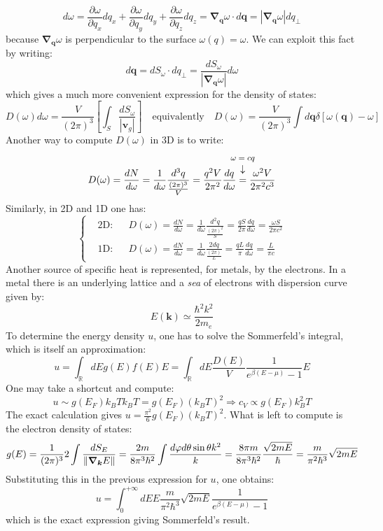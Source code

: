 \documentclass[10.75pt,a4paper,openright,bottom=2cm]{article}
\renewcommand{\Vec}[1]{\boldsymbol{#1}}
\begin{document}
\[
d\omega=\frac{\partial\omega}{\partial q_x}dq_x+\frac{\partial\omega}{\partial q_y}dq_y+\frac{\partial\omega}{\partial q_z}dq_z=\Vec{\nabla}_{\Vec{q}}\omega\cdot d\Vec{q}=|\Vec{\nabla}_{\Vec{q}}\omega|dq_\perp
\]
because $\Vec{\nabla}_{\Vec{q}}\omega$ is perpendicular to the surface $\omega(q)=\omega$. We can exploit this fact by writing: 
\[
d\Vec{q}=dS_\omega\cdot dq_\perp=\frac{dS_\omega}{|\Vec{\nabla}_{\Vec{q}}\omega|}d\omega
\]
which gives a much more convenient expression for the density of states:
\[
D(\omega)d\omega=\frac{V}{(2\pi)^3}\left[\int_S\frac{dS_\omega}{|\Vec{v}_g|}\right] \quad \text{equivalently} \quad D(\omega)=\frac{V}{(2\pi)^3}\int d\Vec{q}\delta[\omega(\Vec{q})-\omega]
\]
Another way to compute $D(\omega)$ in 3D is to write:
\[
D(\omega)=\frac{dN}{d\omega}=\frac{1}{d\omega}\frac{d^3q}{\frac{(2\pi)^3}{V}}=\frac{q^2V}{2\pi^2}\frac{dq}{d\omega}\overset{\mathclap{\tikz \node {$\downarrow$} node [above=1ex] {\footnotesize $\omega=cq$};}}{=}\frac{\omega^2V}{2\pi^2c^3}
\]
Similarly, in 2D and 1D one has:
\[
\left\{
\begin{aligned}
&\text{2D:} &&D(\omega)=\frac{dN}{d\omega}=\frac{1}{d\omega}\frac{d^2q}{\frac{(2\pi)^2}{S}}=\frac{qS}{2\pi}\frac{dq}{d\omega}=\frac{\omega S}{2\pi c^2}\\
&\text{1D:} &&D(\omega)=\frac{dN}{d\omega}=\frac{1}{d\omega}\frac{2dq}{\frac{(2\pi)}{L}}=\frac{qL}{\pi}\frac{dq}{d\omega}=\frac{L}{\pi c}
\end{aligned}
\right.
\]
Another source of specific heat is represented, for metals, by the electrons. In a metal there is an underlying lattice and a \textit{sea} of electrons with dispersion curve given by:
\[
E(\Vec{k})\simeq\frac{\hbar^2k^2}{2m_e}
\]
To determine the energy density $u$, one has to solve the Sommerfeld's integral, which is itself an approximation:
\[
u=\int_\mathbb{R}dEg(E)f(E)E=\int_\mathbb{R}dE\frac{D(E)}{V}\frac{1}{e^{\beta(E-\mu)}-1}E
\]
One may take a shortcut and compute:
\[
u\sim g(E_F)k_BTk_BT=g(E_F)(k_BT)^2\Rightarrow c_V\propto g(E_F)k_B^2T
\]
The exact calculation gives $u=\frac{\pi^2}{6}g(E_F)(k_BT)^2$. What is left to compute is the electron density of states:
\begin{equation}
\label{density}
g(E)=\frac{1}{(2\pi)^3}2\int\frac{dS_E}{\norm{\Vec{\nabla}_{\Vec{k}}E}}=\frac{2 m}{8\pi^3\hbar^2}\int\frac{d\varphi d\theta\sin\theta k^2}{k}=\frac{8\pi m}{8\pi^3\hbar^2}\frac{\sqrt{2mE}}{\hbar}=\frac{m}{\pi^2\hbar^3}\sqrt{2mE}
\end{equation}
Substituting this in the previous expression for $u$, one obtains:
\[
u=\int_0^{+\infty}dEE\frac{m}{\pi^2\hbar^3}\sqrt{2mE}\frac{1}{e^{\beta(E-\mu)}-1}
\]
which is the exact expression giving Sommerfeld's result.
\newpage
\end{document}
